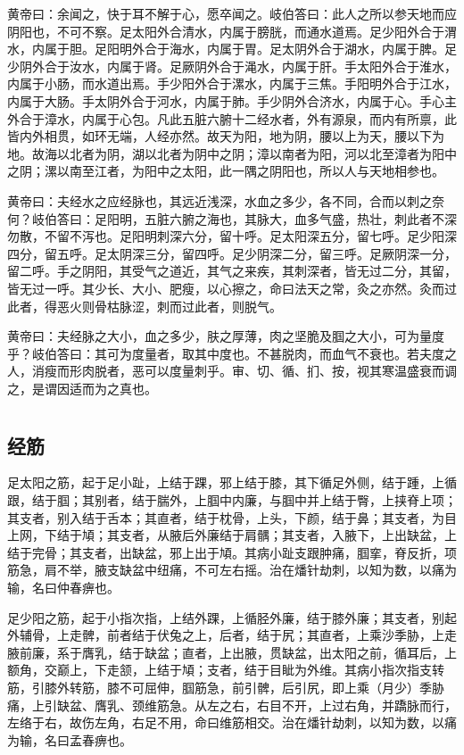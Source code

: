 \documentclass[a4paper,12pt,UTF8,twoside]{ctexbook}
\begin{document}
	黄帝曰：余闻之，快于耳不解于心，愿卒闻之。岐伯答曰：此人之所以参天地而应阴阳也，不可不察。足太阳外合清水，内属于膀胱，而通水道焉。足少阳外合于渭水，内属于胆。足阳明外合于海水，内属于胃。足太阴外合于湖水，内属于脾。足少阴外合于汝水，内属于肾。足厥阴外合于渑水，内属于肝。手太阳外合于淮水，内属于小肠，而水道出焉。手少阳外合于漯水，内属于三焦。手阳明外合于江水，内属于大肠。手太阴外合于河水，内属于肺。手少阴外合济水，内属于心。手心主外合于漳水，内属于心包。凡此五脏六腑十二经水者，外有源泉，而内有所禀，此皆内外相贯，如环无端，人经亦然。故天为阳，地为阴，腰以上为天，腰以下为地。故海以北者为阴，湖以北者为阴中之阴；漳以南者为阳，河以北至漳者为阳中之阴；漯以南至江者，为阳中之太阳，此一隅之阴阳也，所以人与天地相参也。
	
	黄帝曰：夫经水之应经脉也，其远近浅深，水血之多少，各不同，合而以刺之奈何？岐伯答曰：足阳明，五脏六腑之海也，其脉大，血多气盛，热壮，刺此者不深勿散，不留不泻也。足阳明刺深六分，留十呼。足太阳深五分，留七呼。足少阳深四分，留五呼。足太阴深三分，留四呼。足少阴深二分，留三呼。足厥阴深一分，留二呼。手之阴阳，其受气之道近，其气之来疾，其刺深者，皆无过二分，其留，皆无过一呼。其少长、大小、肥瘦，以心擦之，命曰法天之常，灸之亦然。灸而过此者，得恶火则骨枯脉涩，刺而过此者，则脱气。
	
	黄帝曰：夫经脉之大小，血之多少，肤之厚薄，肉之坚脆及腘之大小，可为量度乎？岐伯答曰：其可为度量者，取其中度也。不甚脱肉，而血气不衰也。若夫度之人，消瘦而形肉脱者，恶可以度量刺乎。审、切、循、扪、按，视其寒温盛衰而调之，是谓因适而为之真也。
	
	\part{}
	\chapter{经筋}
	
	足太阳之筋，起于足小趾，上结于踝，邪上结于膝，其下循足外侧，结于踵，上循跟，结于腘；其别者，结于腨外，上腘中内廉，与腘中并上结于臀，上挟脊上项；其支者，别入结于舌本；其直者，结于枕骨，上头，下颜，结于鼻；其支者，为目上网，下结于頄；其支者，从腋后外廉结于肩髃；其支者，入腋下，上出缺盆，上结于完骨；其支者，出缺盆，邪上出于頄。其病小趾支跟肿痛，腘挛，脊反折，项筋急，肩不举，腋支缺盆中纽痛，不可左右摇。治在燔针劫刺，以知为数，以痛为输，名曰仲春痹也。
	
	足少阳之筋，起于小指次指，上结外踝，上循胫外廉，结于膝外廉；其支者，别起外辅骨，上走髀，前者结于伏兔之上，后者，结于尻；其直者，上乘沙季胁，上走腋前廉，系于膺乳，结于缺盆；直者，上出腋，贯缺盆，出太阳之前，循耳后，上额角，交巅上，下走颔，上结于頄；支者，结于目眦为外维。其病小指次指支转筋，引膝外转筋，膝不可屈伸，腘筋急，前引髀，后引尻，即上乘（月少）季胁痛，上引缺盆、膺乳、颈维筋急。从左之右，右目不开，上过右角，并蹻脉而行，左络于右，故伤左角，右足不用，命曰维筋相交。治在燔针劫刺，以知为数，以痛为输，名曰孟春痹也。
	
\end{document}
